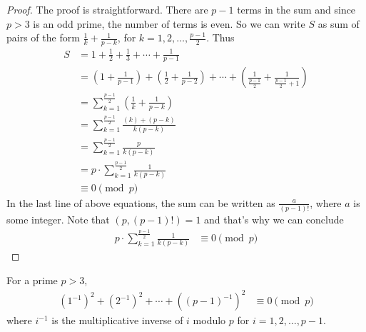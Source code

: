 	\begin{proof}
		The proof is straightforward. There are $p-1$ terms in the sum and since $p>3$ is an odd prime, the number of terms is even. So we can write $S$ as sum of pairs of the form $ \frac{1}{k} +‌\frac{1}{p-k}$, for $k=1, 2, \ldots, \frac{p-1}{2}$. Thus
		\begin{align*}
			S
				&= 1+\frac{1}{2}+ \frac{1}{3}+\cdots+ \frac{1}{p-1}\\
				& = \left(1 + \frac{1}{p-1}\right) +‌\left(\frac{1}{2} + \frac{1}{p-2}\right) + \cdots + \left(\frac{1}{\frac{p-1}{2}} + \frac{1}{\frac{p-1}{2}+1}\right)\\
				& = \sum_{k=1}^{\frac{p-1}{2}} \left(\frac{1}{k}+\frac{1}{p-k} \right)\\
				& = \sum_{k=1}^{\frac{p-1}{2}} \frac{(k) + (p-k)}{k(p-k)}\\
				& = \sum_{k=1}^{\frac{p-1}{2}} \frac{p}{k(p-k)}\\
				& = p\cdot \sum_{k=1}^{\frac{p-1}{2}} \frac{1}{k(p-k)}\\
				& \equiv 0 \pmod p
		\end{align*}
		In the last line of above equations, the sum can be written as $\frac{a}{(p-1)!}$, where $a$ is some integer. Note that $(p, (p-1)!)=1$ and that's why we can conclude
			\begin{align*}
				p \cdot \sum_{k=1}^{\frac{p-1}{2}} \frac{1}{k(p-k)}
					& \equiv 0 \pmod p
			\end{align*}
	\end{proof}

	\begin{lemma}\label{lem:wolstproof2}
		For a prime $p>3$,
			\begin{align*}
				(1^{-1})^2+(2^{-1})^2+\cdots+((p-1)^{-1})^2
					& \equiv 0 \pmod p
			\end{align*}
		where $i^{-1}$ is the multiplicative inverse of $i$ modulo $p$ for $i=1,2,\ldots,p-1$.
	\end{lemma}

